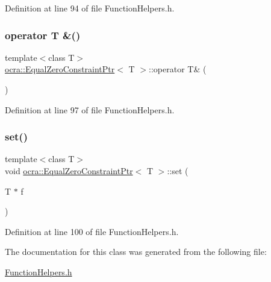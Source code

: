 Definition at line 94 of file Function\+Helpers.\+h.

\hypertarget{classocra_1_1EqualZeroConstraintPtr_a3fbdf66eb7ef747912865e054e61cef6}{}\label{classocra_1_1EqualZeroConstraintPtr_a3fbdf66eb7ef747912865e054e61cef6} 
\subsubsection{\texorpdfstring{operator T \&()}{operator T \&()}}
{\footnotesize\ttfamily template$<$class T$>$ \\
\hyperlink{classocra_1_1EqualZeroConstraintPtr}{ocra\+::\+Equal\+Zero\+Constraint\+Ptr}$<$ T $>$\+::operator T\& (\begin{DoxyParamCaption}{ }\end{DoxyParamCaption})\hspace{0.3cm}{\ttfamily [inline]}}



Definition at line 97 of file Function\+Helpers.\+h.

\hypertarget{classocra_1_1EqualZeroConstraintPtr_a3157efd4dbc5db4141fa688fd8032b78}{}\label{classocra_1_1EqualZeroConstraintPtr_a3157efd4dbc5db4141fa688fd8032b78} 
\subsubsection{\texorpdfstring{set()}{set()}}
{\footnotesize\ttfamily template$<$class T$>$ \\
void \hyperlink{classocra_1_1EqualZeroConstraintPtr}{ocra\+::\+Equal\+Zero\+Constraint\+Ptr}$<$ T $>$\+::set (\begin{DoxyParamCaption}\item[{T $\ast$}]{f }\end{DoxyParamCaption})\hspace{0.3cm}{\ttfamily [inline]}}



Definition at line 100 of file Function\+Helpers.\+h.



The documentation for this class was generated from the following file\+:\begin{DoxyCompactItemize}
\item 
\hyperlink{FunctionHelpers_8h}{Function\+Helpers.\+h}\end{DoxyCompactItemize}
